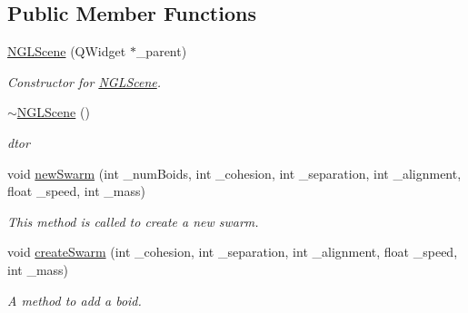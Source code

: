 \subsection*{Public Member Functions}
\begin{DoxyCompactItemize}
\item 
\hyperlink{classNGLScene_a5c5abd9632cc61aa6bfbb8c237d66f27}{N\-G\-L\-Scene} (Q\-Widget $\ast$\-\_\-parent)
\begin{DoxyCompactList}\small\item\em Constructor for \hyperlink{classNGLScene}{N\-G\-L\-Scene}. \end{DoxyCompactList}\item 
\hypertarget{classNGLScene_abda05d130945833bfbb6bad8d619f7f5}{\hyperlink{classNGLScene_abda05d130945833bfbb6bad8d619f7f5}{$\sim$\-N\-G\-L\-Scene} ()}\label{classNGLScene_abda05d130945833bfbb6bad8d619f7f5}

\begin{DoxyCompactList}\small\item\em dtor \end{DoxyCompactList}\item 
void \hyperlink{classNGLScene_a095aa31c773745194160da96fc5aebe8}{new\-Swarm} (int \-\_\-num\-Boids, int \-\_\-cohesion, int \-\_\-separation, int \-\_\-alignment, float \-\_\-speed, int \-\_\-mass)
\begin{DoxyCompactList}\small\item\em This method is called to create a new swarm. \end{DoxyCompactList}\item 
void \hyperlink{classNGLScene_aace337174f906e2ba944d233c9f4f529}{create\-Swarm} (int \-\_\-cohesion, int \-\_\-separation, int \-\_\-alignment, float \-\_\-speed, int \-\_\-mass)
\begin{DoxyCompactList}\small\item\em A method to add a boid. \end{DoxyCompactList}\end{DoxyCompactItemize}
